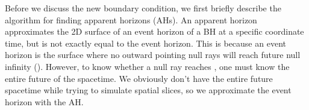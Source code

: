 \begin{bibunit}[unsrtnat]
Before we discuss the new boundary condition, we first briefly describe the
algorithm for finding apparent horizons (AHs). An apparent horizon approximates
the 2D surface of an event horizon of a BH at a specific coordinate time, but is
not exactly equal to the event horizon. This is because an event horizon is the
surface where no outward pointing null rays will reach future null infinity
(\scri). However, to know whether a null ray reaches \scri, one must know the
entire future of the spacetime. We obviously don't have the entire future
spacetime while trying to simulate spatial slices, so we approximate the event
horizon with the AH.

\begin{figure}[htb]
   \centering
\end{figure}
\end{bibunit}
